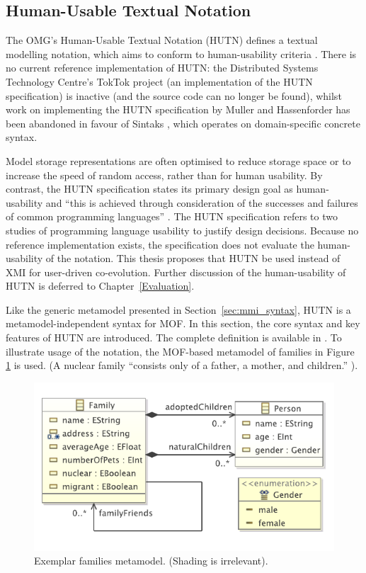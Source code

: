 \subsection{Human-Usable Textual Notation}
\label{subsec:hutn}
The OMG's Human-Usable Textual Notation (HUTN) \cite{hutn} defines a textual modelling notation, which aims to conform to human-usability criteria \cite{hutn}. There is no current reference implementation of HUTN: the Distributed Systems Technology Centre's TokTok project (an implementation of the HUTN specification) is inactive (and the source code can no longer be found), whilst work on implementing the HUTN specification by Muller and Hassenforder \cite{muller05hutn} has been abandoned in favour of Sintaks \cite{sintaks}, which operates on domain-specific concrete syntax.

Model storage representations are often optimised to reduce storage space or to increase the speed of random access, rather than for human usability. By contrast, the HUTN specification states its primary design goal as human-usability and ``this is achieved through consideration of the successes and failures of common programming languages'' \cite[Section 2.2]{hutn}. The HUTN specification refers to two studies of programming language usability to justify design decisions. Because no reference implementation exists, the specification does not evaluate the human-usability of the notation. This thesis proposes that HUTN be used instead of XMI for user-driven co-evolution. Further discussion of the human-usability of HUTN is deferred to Chapter~\ref{Evaluation}.

Like the generic metamodel presented in Section~\ref{sec:mmi_syntax}, HUTN is a metamodel-independent syntax for 
MOF. In this section, the core syntax and key features of HUTN are introduced. The complete definition is available
in \cite{hutn}. To illustrate usage of the notation, the MOF-based metamodel of families in Figure \ref{fig:example-mm} is used. (A nuclear family ``consists only of a father, a mother, and children.'' \cite{nucleardef}).

\begin{figure}[htbp]
  \begin{center}
    \leavevmode
    \includegraphics[scale=0.85]{5.Implementation/families.pdf}
  \end{center}
  \caption{Exemplar families metamodel. (Shading is irrelevant).}
  \label{fig:example-mm}
\end{figure}


